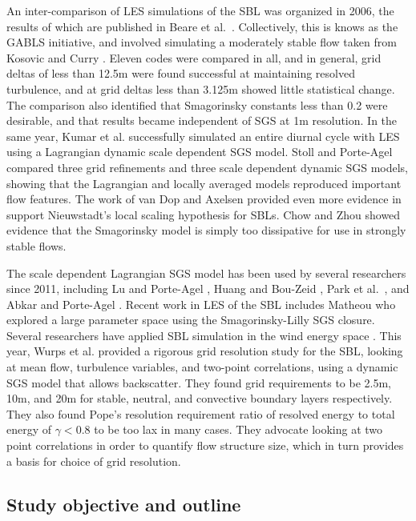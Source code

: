 \documentclass[conf]{new-aiaa}
\begin{document}
An inter-comparison of LES simulations of the SBL was organized in 2006, the results of which are published in Beare et al.\ \cite{Beare2006}. Collectively, this is knows as the GABLS initiative, and involved simulating a moderately stable flow taken from Kosovic and Curry \cite{Kosovic2000}. Eleven codes were compared in all, and in general, grid deltas of less than 12.5m were found successful at maintaining resolved turbulence, and at grid deltas less than 3.125m showed little statistical change. The comparison also identified that Smagorinsky constants less than 0.2 were desirable, and that results became independent of SGS at 1m resolution. In the same year, Kumar et al. \cite{Kumar2006} successfully simulated an entire diurnal cycle with LES using a Lagrangian dynamic scale dependent SGS model. Stoll and Porte-Agel \cite{Stoll2007} compared three grid refinements and three scale dependent dynamic SGS models, showing that the Lagrangian and locally averaged models reproduced important flow features. The work of van Dop and Axelsen \cite{vanDop2007} provided even more evidence in support Nieuwstadt's local scaling hypothesis for SBLs. Chow and Zhou \cite{Chow2011} showed evidence that the Smagorinsky model is simply too dissipative for use in strongly stable flows. 

The scale dependent Lagrangian SGS model has been used by several researchers since 2011, including Lu and Porte-Agel \cite{Lu2011}, Huang and Bou-Zeid \cite{Huang2013}, Park et al.\ \cite{Park2014}, and Abkar and Porte-Agel \cite{Abkar2015}. Recent work in LES of the SBL includes Matheou \cite{Matheou2016} who explored a large parameter space using the Smagorinsky-Lilly SGS closure. Several researchers have applied SBL simulation in the wind energy space \cite{Aitken2014, Abkar2015, Ghaisas2017}. This year, Wurps et al. \cite{Wurps2020} provided a rigorous grid resolution study for the SBL, looking at mean flow, turbulence variables, and two-point correlations, using a dynamic SGS model that allows backscatter. They found grid requirements to be 2.5m, 10m, and 20m for stable, neutral, and convective boundary layers respectively. They also found Pope's resolution requirement ratio of resolved energy to total energy of $\gamma < 0.8$ to be too lax in many cases. They advocate looking at two point correlations in order to quantify flow structure size, which in turn provides a basis for choice of grid resolution.  



\subsection{Study objective and outline}
\end{document}
